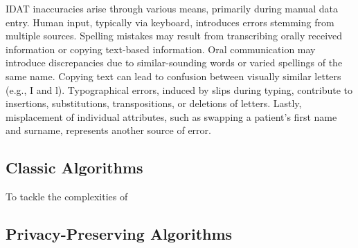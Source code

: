 \Ac{IDAT} inaccuracies arise through various means, primarily during manual data entry.
Human input, typically via keyboard, introduces errors stemming from multiple sources.
Spelling mistakes may result from transcribing orally received information or copying text-based information.
Oral communication may introduce discrepancies due to similar-sounding words or varied spellings of the same name.
Copying text can lead to confusion between visually similar letters (e.g., I and l).
Typographical errors, induced by slips during typing, contribute to insertions, substitutions, transpositions, or deletions of letters.
Lastly, misplacement of individual attributes, such as swapping a patient's first name and surname, represents another source of error.


\subsection{Classic Algorithms}
To tackle the complexities of
\subsection{Privacy-Preserving Algorithms}
